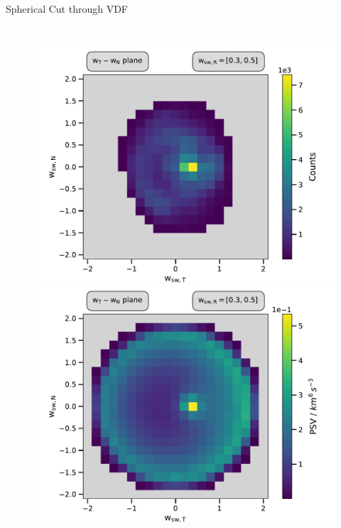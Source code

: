 \documentclass{beamer}
\begin{document}
\begin{frame}{Spherical Cut through VDF}
\begin{columns}
	\column{3cm}
	\begin{figure}
		
		\includegraphics[scale=.2]{Pics/cart_50_counts_R.pdf}
		\includegraphics[scale=.2]{Pics/cart_50_norm_R.pdf}
		

\end{figure}
\end{columns}
\end{frame}
\end{document}
